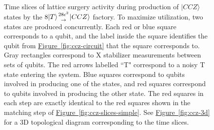\documentclass[twocolumn,accepted=2019-03-30]{quantumarticle}
\newcommand{\fig}[1]{\hyperref[fig:#1]{Figure~\ref*{fig:#1}}}
\newcommand{\factory}[3]{$#1 \genfrac{}{}{0pt}{}{#2}{\rightarrow} {#3}$ factory}
\begin{document}
\begin{figure}
  \label{fig:ccz-slices-simple}
  \caption{
    Time slices of lattice surgery activity during production of a single $|CCZ\rangle$ state.
    Each red square corresponds to a qubit, and the label inside the red square identifies the qubit from \fig{ccz-circuit} that the square corresponds to.
    Gray rectangles correspond to X stabilizer measurements between sets of qubits.
    The red arrows labelled ``T" correspond to a noisy T state entering the system.
    It is possible to double the throughput shown here by interleaving the production of two states (shown in \fig{ccz-slices}).
  }

  \caption{
    Time slices of lattice surgery activity during production of $|CCZ\rangle$ states by the \factory{8|T\rangle}{28\epsilon^2}{|CCZ\rangle}.
    To maximize utilization, two states are produced concurrently.
    Each red or blue square corresponds to a qubit, and the label inside the square identifies the qubit from \fig{ccz-circuit} that the square corresponds to.
    Gray rectangles correspond to X stabilizer measurements between sets of qubits.
    The red arrows labelled ``T" correspond to a noisy T state entering the system.
    Blue squares correspond to qubits involved in producing one of the states, and red squares correspond to qubits involved in producing the other state.
    The red squares in each step are exactly identical to the red squares shown in the matching step of \fig{ccz-slices-simple}.
    See \fig{ccz-3d} for a 3D topological diagram corresponding to the time slices.
  }
  \label{fig:ccz-slices}
\end{figure}
\end{document}
